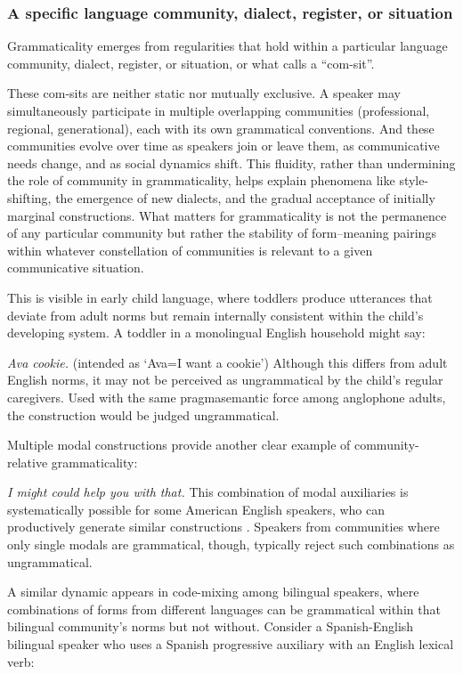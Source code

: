 \subsubsection{A specific language community, dialect, register, or situation}

Grammaticality emerges from regularities that hold within a particular language community, dialect, register, or situation, or what \textcite[3]{wiese2023} calls a ``com-sit''.

These com-sits are neither static nor mutually exclusive. A speaker may simultaneously participate in multiple overlapping communities (professional, regional, generational), each with its own grammatical conventions. And these communities evolve over time as speakers join or leave them, as communicative needs change, and as social dynamics shift. This fluidity, rather than undermining the role of community in grammaticality, helps explain phenomena like style-shifting, the emergence of new dialects, and the gradual acceptance of initially marginal constructions. What matters for grammaticality is not the permanence of any particular community but rather the stability of form--meaning pairings within whatever constellation of communities is relevant to a given communicative situation.

This is visible in early child language, where toddlers produce utterances that deviate from adult norms but remain internally consistent within the child's developing system. A toddler in a monolingual English household might say:

\ea
\textit{Ava cookie.} (intended as `Ava=I want a cookie')
\z
Although this differs from adult English norms, it may not be perceived as ungrammatical by the child's regular caregivers. Used with the same pragmasemantic force among anglophone adults, the construction would be judged ungrammatical.

Multiple modal constructions provide another clear example of community-relative grammaticality:

\ea
\textit{I might could help you with that.}
\z
This combination of modal auxiliaries is systematically possible for some American English speakers, who can productively generate similar constructions \autocite{morin2024semantics}. Speakers from communities where only single modals are grammatical, though, typically reject such combinations as ungrammatical.

A similar dynamic appears in code-mixing among bilingual speakers, where combinations of forms from different languages can be grammatical within that bilingual community’s norms but not without. Consider a Spanish-English bilingual speaker who uses a Spanish progressive auxiliary with an English lexical verb:


